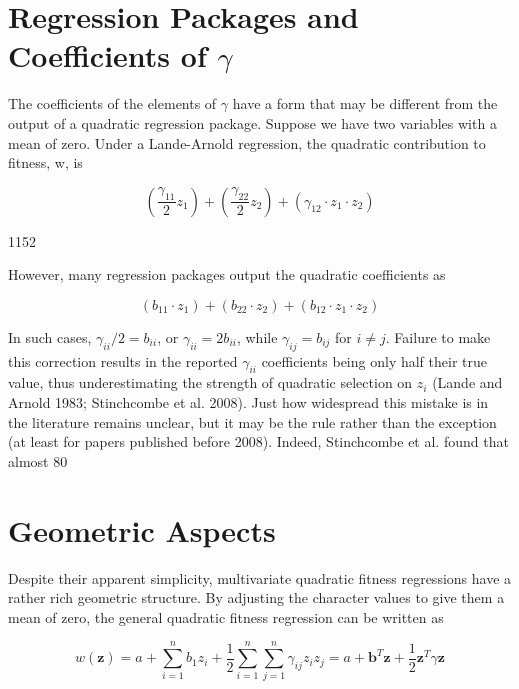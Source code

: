\documentclass{article}
\begin{document}
\section{Regression Packages and Coefficients of  $ \gamma $}
The coefficients of the elements of  $ \gamma $ have a form that may be different from the output of a quadratic regression package. Suppose we have two variables with a mean of zero. Under a Lande-Arnold regression, the quadratic contribution to fitness, w, is

\begin{equation}
\left(\frac{\gamma_{11}}{2}z_{1}\right)+\left(\frac{\gamma_{22}}{2}z_{2}\right)+\left(\gamma_{12}\cdot z_{1}\cdot z_{2}\right)
\end{equation}

1152

However, many regression packages output the quadratic coefficients as

\begin{equation}
(b_{11}\cdot z_{1})+(b_{22}\cdot z_{2})+(b_{12}\cdot z_{1}\cdot z_{2})
\end{equation}

In such cases,  $ \gamma_{ii}/2 = b_{ii} $, or  $ \gamma_{ii} = 2b_{ii} $, while  $ \gamma_{ij} = b_{ij} $ for  $ i \neq j $. Failure to make this correction results in the reported  $ \gamma_{ii} $ coefficients being only half their true value, thus underestimating the strength of quadratic selection on  $ z_i $ (Lande and Arnold 1983; Stinchcombe et al. 2008). Just how widespread this mistake is in the literature remains unclear, but it may be the rule rather than the exception (at least for papers published before 2008). Indeed, Stinchcombe et al. found that almost 80%

\section{Geometric Aspects}
Despite their apparent simplicity, multivariate quadratic fitness regressions have a rather rich geometric structure. By adjusting the character values to give them a mean of zero, the general quadratic fitness regression can be written as

\begin{equation}
w(\mathbf{z})=a+\sum_{i=1}^{n}b_{1}z_{i}+\frac{1}{2}\sum_{i=1}^{n}\sum_{j=1}^{n}\gamma_{ij}z_{i}z_{j}=a+\mathbf{b}^{T}\mathbf{z}+\frac{1}{2}\mathbf{z}^{T}\gamma\mathbf{z}
\tag{30.19}
\label{eq:30_19}
\end{equation}
\end{document}
